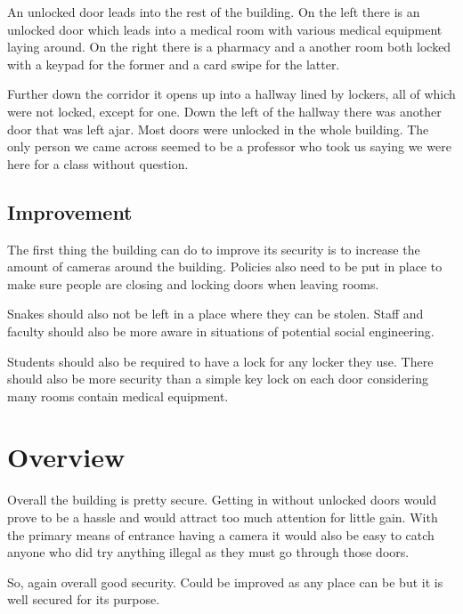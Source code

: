\documentclass[12pt]{article}
\begin{document}
        An unlocked door leads into the rest of the building. On the left there is 
        an unlocked door which leads into a medical room with various medical
        equipment laying around. On the right there is a pharmacy and a another room
        both locked with a keypad for the former and a card swipe for the latter.

        Further down the corridor it opens up into a hallway lined by lockers, all of
        which were not locked, except for one. Down the left of the hallway there was
        another door that was left ajar. Most doors were unlocked in the whole building.
        The only person we came across seemed to be a professor who took us saying we
        were here for a class without question. 

        \subsection{Improvement}
        The first thing the building can do to improve its security is to increase the
        amount of cameras around the building. Policies also need to be put in place
        to make sure people are closing and locking doors when leaving rooms. 

        Snakes should also not be left in a place where they can be stolen. Staff and
        faculty should also be more aware in situations of potential social
        engineering. 

        Students should also be required to have a lock for any locker they use. There
        should also be more security than a simple key lock on each door considering
        many rooms contain medical equipment.

\section{Overview}
        Overall the building is pretty secure. Getting in without unlocked doors would
        prove to be a hassle and would attract too much attention for little gain. 
        With the primary means of entrance having a camera it would also be easy to 
        catch anyone who did try anything illegal as they must go through those doors.

        So, again overall good security. Could be improved as any place can be but it 
        is well secured for its purpose.
\end{document}
